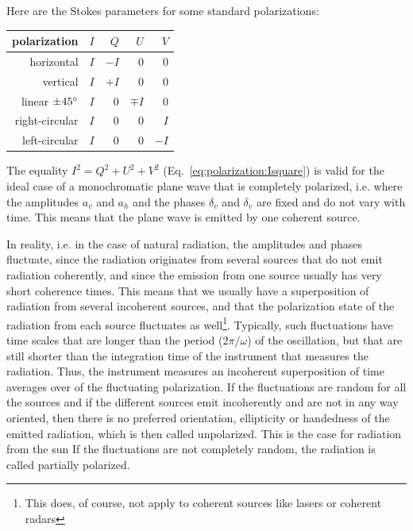 Here are the Stokes parameters for some standard polarizations:
\begin{center}
\label{stokes-examples}
\begin{tabular}{r@{\hspace{2em}(}r@{,}r@{,}r@{,}r@{)}}
\hline
polarization & $I$ &   $Q$   &   $U$  &   $V$ \\ \hline
horizontal   & $I$ &  $-I$   &    0   &   0   \\ 
vertical     & $I$ &  $+I$   &    0   &   0   \\ 
linear $\pm 45^\circ$
             & $I$ &   0     &$\mp I$ &   0   \\ 
right-circular& $I$ &  0     &    0   &   $I$ \\ 
left-circular& $I$ &   0     &    0   &  $-I$ \\ \hline
\end{tabular}
\end{center}



\label{sec:polarization:part_pol}
The equality   $I^2 = Q^2 + U^2 + V^2$
(Eq.~\ref{eq:polarization:Isquare}) 
is valid for the ideal case of a 
monochromatic plane wave that is completely polarized, i.e. where the
amplitudes $a_v$ and
$a_h$ and the phases $\delta_v$ and $\delta_v$ are fixed and do not
vary with time. This means that the plane wave is emitted by one
coherent source.

In reality, i.e. in the case of natural radiation, 
the amplitudes and phases fluctuate, since the radiation
originates from several sources that do not emit radiation coherently,
and since the emission from one source usually has very short
coherence times. This
means that we usually have a superposition of radiation from several incoherent
sources, and that the polarization state of the radiation from each
source fluctuates as well\footnote{This does, of course, not apply to
  coherent sources like lasers or coherent radars}. 
Typically, such fluctuations have time scales that are longer than the
period ($2\pi/\omega$) of the oscillation, but that are still shorter
than the integration time of the instrument that measures the
radiation. Thus, the instrument measures an incoherent
 superposition of time averages
over of the fluctuating polarization. If the fluctuations are
random for all the sources and if the different sources emit 
incoherently and are not in any way oriented, then there is no preferred
orientation, ellipticity or handedness of the emitted radiation, which
is then called unpolarized. This is the case for radiation from the sun
If the fluctuations are not completely random, the
radiation is called partially polarized.

